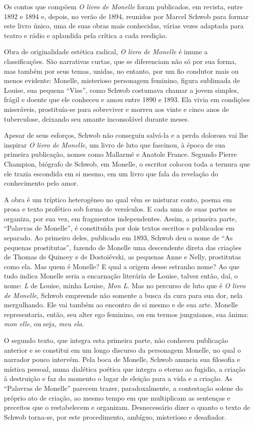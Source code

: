Os contos que compõem \textit{O livro de Monelle} foram publicados,
em revista, entre 1892 e 1894 e, depois, no verão de 1894, reunidos por Marcel
Schwob para formar este livro único, uma de suas obras mais conhecidas, várias
vezes adaptada para teatro e rádio e aplaudida pela crítica a cada reedição.

Obra de originalidade estética radical, \textit{O livro de Monelle} é imune
a classificações. São narrativas curtas, que se diferenciam não só por sua
forma, mas também por seus temas, unidas, no entanto, por um fio condutor
mais ou menos evidente: Monelle, misterioso personagem feminino, figura
sublimada de Louise, sua pequena “Vise”, como Schwob costumava chamar a
jovem simples, frágil e doente que ele conheceu e amou entre 1890 e 1893. Ela
vivia em condições miseráveis, prostituía-se para sobreviver e morreu aos vinte
e cinco anos de tuberculose, deixando seu amante inconsolável durante meses.

Apesar de seus esforços, Schwob não conseguiu salvá-la e a perda dolorosa
vai lhe inspirar \textit{O livro de Monelle}, um livro de luto que fascinou, à
época de sua primeira publicação, nomes como Mallarmé e Anatole France.
Segundo Pierre Champion, biógrafo de Schwob, em Monelle, o escritor colocou
toda a ternura que ele trazia escondida em si mesmo, em um livro que fala da
revelação do conhecimento pelo amor.

A obra é um tríptico heterogêneo no qual vêm se misturar conto, poema em
prosa e texto profético sob forma de versículos. E cada uma de suas partes se
organiza, por sua vez, em fragmentos independentes. Assim, a primeira parte,
``Palavras de Monelle'', é constituída por dois textos escritos e
publicados em separado. Ao primeiro deles, publicado em 1893, Schwob deu o nome
de ``As pequenas prostitutas'', fazendo de Monelle uma descendente direta
das criações de Thomas de Quincey e de Dostoiévski, as pequenas Anne e Nelly,
prostitutas como ela. Mas quem é Monelle? E qual a origem desse estranho nome?
Ao que tudo indica Monelle seria a encarnação literária de Louise, talvez então, daí,
o nome: \textit{L} de Louise, minha Louise, \textit{Mon L}. Mas no percurso de luto
que é \textit{O livro de Monelle}, Schwob empreende não somente a busca da cura para
sua dor, nela mergulhando. Ele vai também ao encontro de si mesmo e de sua arte.
Monelle representaria, então, seu alter ego feminino, ou em termos junguianos,
sua ânima: \textit{mon elle}, ou seja, \textit{meu ela}.

O segundo texto, que integra esta primeira parte, não conheceu publicação
anterior e se constitui em um longo discurso da personagem Monelle, no qual o
narrador pouco intervém. Pela boca de Monelle, Schwob anuncia sua filosofia e
mística pessoal, numa dialética poética que integra o eterno ao fugidio, a
criação à destruição e faz do momento o lugar de eleição para a vida e a
criação. As ``Palavras de Monelle'' parecem trazer, paradoxalmente, a
contestação solene do próprio ato de criação, ao mesmo tempo em que multiplicam
as sentenças e preceitos que o restabelecem e organizam. Desnecessário dizer o
quanto o texto de Schwob torna-se, por este procedimento, ambíguo, misterioso e
desafiador.

